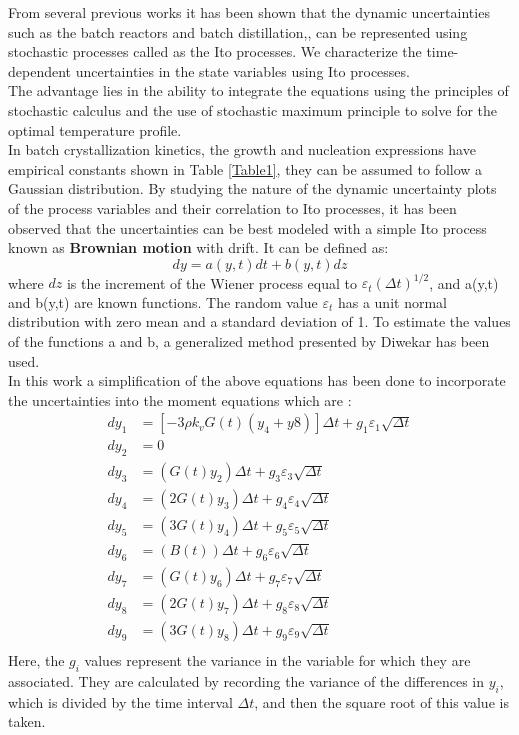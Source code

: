 From several previous works it has been shown that the dynamic uncertainties
such as the batch reactors\cite{benavides2} and batch distillation,\cite{diwekar}, can be represented using stochastic processes called as the Ito processes.  We characterize the time-dependent uncertainties in the state variables using Ito processes.\\
The advantage lies in the ability to integrate the equations using the principles of stochastic calculus and the use of stochastic maximum principle to solve for the optimal temperature profile. \\
In batch crystallization kinetics, the growth and nucleation expressions have empirical constants shown in Table \ref{Table1}, they can be assumed to follow a Gaussian distribution\cite{yenkie}. By studying the nature of the dynamic uncertainty plots of the process variables and their correlation to Ito processes, it has been observed that the uncertainties can be best modeled with a simple Ito process known as \textbf{Brownian motion} with drift\cite{diwekar}\cite{wong}. It can be defined as:
\begin{equation}
dy = a(y,t)dt + b(y,t)dz
\end{equation}
where $dz$ is the increment of the Wiener process equal to $\varepsilon_{t}(\Delta t)^{1/2}$, and a(y,t) and b(y,t) are known functions. The random value $\varepsilon_{t}$  has a unit normal distribution with zero mean
and a standard deviation of 1. To estimate the values of the functions a and b, a generalized method presented by Diwekar\cite{diwekar} has been used.\\
In this work a simplification of the above equations has been done to incorporate the uncertainties into the moment equations which are\cite{yenkie} :
\begin{align}
dy_{1} &= \left[-3\rho k_{v}G(t)(y_{4}+y{8})\right]\Delta t + g_{1}\varepsilon_{1}\sqrt{\Delta t} \\
dy_{2} &= 0 \\
dy_{3} &= (G(t)y_{2})\Delta t +g_{3}\varepsilon_{3}\sqrt{\Delta t} \\
dy_{4} &= (2G(t)y_{3})\Delta t + g_{4}\varepsilon_{4}\sqrt{\Delta t} \\
dy_{5} &= (3G(t)y_{4})\Delta t + g_{5}\varepsilon_{5}\sqrt{\Delta t} \\
dy_{6} &= (B(t))\Delta t + g_{6}\varepsilon_{6}\sqrt{\Delta t} \\
dy_{7} &= (G(t)y_{6})\Delta t + g_{7}\varepsilon_{7}\sqrt{\Delta t} \\
dy_{8} &= (2G(t)y_{7})\Delta t +g_{8}\varepsilon_{8}\sqrt{\Delta t} \\
dy_{9} &= (3G(t)y_{8})\Delta t + g_{9}\varepsilon_{9}\sqrt{\Delta t} \\
\end{align} 
Here, the $g_{i}$ values represent the variance in the variable for which they are associated. They are calculated by recording the variance of the differences in $y_{i}$, which is divided by the time
interval $\Delta t$, and then the square root of this value is taken.


